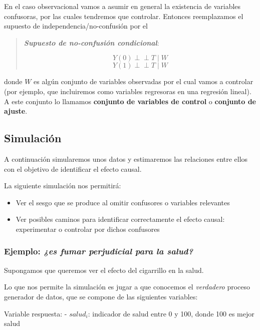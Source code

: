 \documentclass[
  a4paper,
  DIV=11,
  numbers=noendperiod]{scrreprt}
\providecommand{\tightlist}{%
  \setlength{\itemsep}{0pt}\setlength{\parskip}{0pt}}\usepackage{longtable,booktabs,array}
\begin{document}
En el caso observacional vamos a asumir en general la existencia de
variables confusoras, por las cuales tendremos que controlar. Entonces
reemplazamos el supuesto de independencia/no-confusión por el

\begin{quote}
\textbf{\emph{Supuesto de no-confusión condicional}}:

\[ Y(0){\perp\!\!\!\perp}T \mid W\] \[ Y(1){\perp\!\!\!\perp}T \mid W\]
\end{quote}

donde \(W\) es algún conjunto de variables observadas por el cual vamos
a controlar (por ejemplo, que incluiremos como variables regresoras en
una regresión lineal). A este conjunto lo llamamos \textbf{conjunto de
variables de control} o \textbf{conjunto de ajuste}.

\subsection{Simulación}\label{simulaciuxf3n}

A continuación simularemos unos datos y estimaremos las relaciones entre
ellos con el objetivo de identificar el efecto causal.

La siguiente simulación nos permitirá:

\begin{itemize}
\tightlist
\item
  Ver el sesgo que se produce al omitir confusores o variables
  relevantes
\item
  Ver posibles caminos para identificar correctamente el efecto causal:
  experimentar o controlar por dichos confusores
\end{itemize}

\subsubsection{\texorpdfstring{Ejemplo: \emph{¿es fumar perjudicial para
la
salud?}}{Ejemplo: ¿es fumar perjudicial para la salud?}}\label{ejemplo-es-fumar-perjudicial-para-la-salud}

Supongamos que queremos ver el efecto del cigarrillo en la salud.

Lo que nos permite la simulación es jugar a que conocemos el
\emph{verdadero} proceso generador de datos, que se compone de las
siguientes variables:

Variable respuesta: - \(salud_i\): indicador de salud entre 0 y 100,
donde 100 es mejor salud
\end{document}
